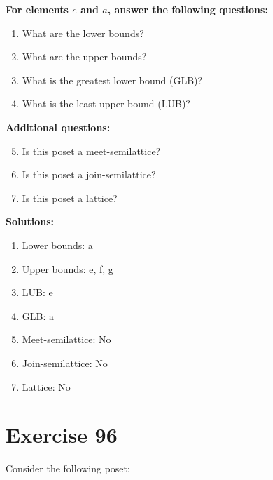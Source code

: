 \documentclass{article}
\begin{document}
    \textbf{For elements $e$ and $a$, answer the following questions:}
\begin{enumerate}
    \item What are the lower bounds?
    \item What are the upper bounds?
    \item What is the greatest lower bound (GLB)?
    \item What is the least upper bound (LUB)?
\end{enumerate}
    \hspace*{3ex} \textbf{Additional questions:}
\begin{enumerate}
    \setcounter{enumi}{4}
    \item Is this poset a meet-semilattice?
    \item Is this poset a join-semilattice?
    \item Is this poset a lattice?
\end{enumerate}

\textbf{Solutions:}
\begin{enumerate}
    \item Lower bounds: {a}
    \item Upper bounds: {e, f, g}
    \item LUB: e
    \item GLB: a
    \item Meet-semilattice: No
    \item Join-semilattice: No
    \item Lattice: No
\end{enumerate}
\newpage
\section*{Exercise 96}
Consider the following poset:
\begin{center}
\end{center}
\end{document}
